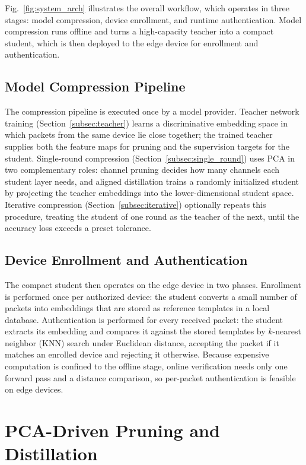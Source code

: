 \documentclass[journal,comsoc]{IEEEtran}
\begin{document}
Fig.~\ref{fig:system_arch} illustrates the overall workflow, which operates in three stages: model compression, device enrollment, and runtime authentication.
Model compression runs offline and turns a high-capacity teacher into a compact student, which is then deployed to the edge device for enrollment and authentication.

\subsection{Model Compression Pipeline}

The compression pipeline is executed once by a model provider.
Teacher network training (Section~\ref{subsec:teacher}) learns a discriminative embedding space in which packets from the same device lie close together; the trained teacher supplies both the feature maps for pruning and the supervision targets for the student.
Single-round compression (Section~\ref{subsec:single_round}) uses PCA in two complementary roles: channel pruning decides how many channels each student layer needs, and aligned distillation trains a randomly initialized student by projecting the teacher embeddings into the lower-dimensional student space.
Iterative compression (Section~\ref{subsec:iterative}) optionally repeats this procedure, treating the student of one round as the teacher of the next, until the accuracy loss exceeds a preset tolerance.

\subsection{Device Enrollment and Authentication}

The compact student then operates on the edge device in two phases.
Enrollment is performed once per authorized device: the student converts a small number of packets into embeddings that are stored as reference templates in a local database.
Authentication is performed for every received packet: the student extracts its embedding and compares it against the stored templates by $k$-nearest neighbor (KNN) search under Euclidean distance, accepting the packet if it matches an enrolled device and rejecting it otherwise.
Because expensive computation is confined to the offline stage, online verification needs only one forward pass and a distance comparison, so per-packet authentication is feasible on edge devices.

\section{PCA-Driven Pruning and Distillation}
\label{sec:design}
\end{document}
